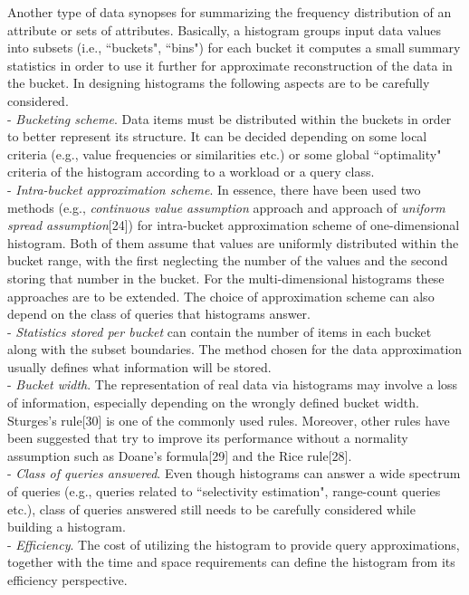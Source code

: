 \documentclass[10pt, conference, compsocconf]{IEEEtran}
\begin{document}
Another type of data synopses for summarizing the frequency distribution of an attribute or sets of attributes. Basically, a histogram groups input data values into subsets (i.e., ``buckets", ``bins") for each bucket it computes a small summary statistics in order to use it further for approximate reconstruction of the data in the bucket. In designing histograms the following aspects are to be carefully considered.  \\
- \textit{Bucketing scheme}. Data items must be distributed within the buckets in order to better represent its structure. It can be decided depending on some local criteria (e.g., value frequencies or similarities etc.) or some global ``optimality" criteria of the histogram according to a workload or a query class.\\
- \textit{Intra-bucket approximation scheme}. In essence, there have been used two methods (e.g., \textit{continuous value assumption} approach and  approach of \textit{uniform spread assumption}[24]) for intra-bucket approximation scheme of one-dimensional histogram. Both of them assume that values are uniformly distributed within the bucket range, with the first neglecting the number of the values and the second storing that number in the bucket. For the multi-dimensional histograms these approaches are to be extended. The choice of approximation scheme can also depend on the class of queries that histograms answer.\\
- \textit{Statistics stored per bucket} can contain the number of items in each bucket along with the subset boundaries. The method chosen for the data approximation usually defines what information will be stored.\\
- \textit{Bucket width}. The representation of real data via histograms may involve a loss of information, especially depending on the wrongly defined bucket width. Sturges's rule[30] is one of the commonly used rules. Moreover, other rules have been suggested that try to improve its performance without a normality assumption such as Doane's formula[29] and the Rice rule[28].\\ 
- \textit{Class of queries answered}. Even though histograms can answer a wide spectrum of queries (e.g., queries related to ``selectivity estimation", range-count queries etc.), class of queries answered still needs to be carefully considered while building a histogram.\\ 
- \textit{Efficiency}. The cost of utilizing the histogram to provide query approximations, together with the time and space requirements can define the histogram from its efficiency perspective.\\
\end{document}
